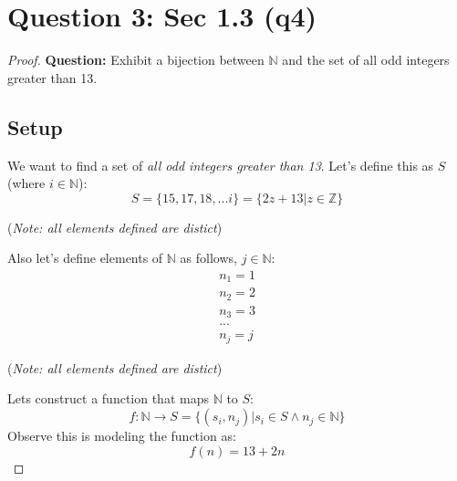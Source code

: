 \documentclass[11pt]{article}
\theoremstyle{plain}
\begin{document}
\section*{Question 3: Sec 1.3 (q4)}
\begin{proof} \textbf{Question:} Exhibit a bijection between $\mathbb{N}$ and the set of all odd integers greater than 13.
	\subsection*{Setup}
	We want to find a set of \textit{all odd integers greater than 13}. Let's define this as $S$ (where $i \in \mathbb{N}$):
	\[
		S = \{ 15,17,18,...i \}= \{ 2z+13 | z \in \mathbb{Z}\}
	\]
	\begin{center} (\textit{Note: all elements defined are distict}) \end{center}
	Also let's define elements of $\mathbb{N}$ as follows, $j \in \mathbb{N}$:
	\begin{align*}
		n_1 = 1 \\
		n_2 = 2 \\
		n_3 = 3 \\
		...     \\
		n_j = j
	\end{align*}
	\begin{center} (\textit{Note: all elements defined are distict}) \end{center}
	Lets construct a function that maps $\mathbb{N}$ to $S$:
	\[
		f: \mathbb{N} \rightarrow S = \{ (s_i,n_j) | s_i \in S \land n_j \in \mathbb{N}  \}
	\]
	Observe this is modeling the function as:
	\[
		f(n) = 13 + 2n
	\]

\end{proof}
\end{document}
